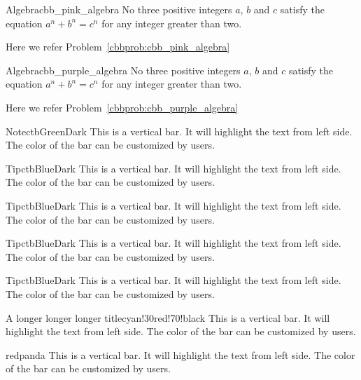 \documentclass[11pt, letterpaper]{../src/exercise}
\begin{document}
    \begin{cbbpinkproblem}{Algebra}{cbb_pink_algebra}
    No three positive integers \(a\), \(b\) and \(c\) satisfy the equation
    \(a^{n} + b^{n} = c^{n}\) for any integer greater than two.
    \end{cbbpinkproblem}
    Here we refer Problem~\ref{cbbprob:cbb_pink_algebra}

    \begin{cbbpurpleproblem}{Algebra}{cbb_purple_algebra}
    No three positive integers \(a\), \(b\) and \(c\) satisfy the equation
    \(a^{n} + b^{n} = c^{n}\) for any integer greater than two.
    \end{cbbpurpleproblem}
    Here we refer Problem~\ref{cbbprob:cbb_purple_algebra}

    \begin{cbbar}{Note}{ctbGreenDark}
        This is a vertical bar.
        It will highlight the text from left side.
        The color of the bar can be customized by users.
    \end{cbbar}

    \begin{cbbar}{Tip}{ctbBlueDark}
        This is a vertical bar.
        It will highlight the text from left side.
        The color of the bar can be customized by users.
    \end{cbbar}

    \begin{cbbar}{Tip}{ctbBlueDark}
        This is a vertical bar.
        It will highlight the text from left side.
        The color of the bar can be customized by users.
    \end{cbbar}

    \begin{cbbar}{Tip}{ctbBlueDark}
        This is a vertical bar.
        It will highlight the text from left side.
        The color of the bar can be customized by users.
    \end{cbbar}

    \begin{cbbar}{Tip}{ctbBlueDark}
        This is a vertical bar.
        It will highlight the text from left side.
        The color of the bar can be customized by users.
    \end{cbbar}

    \begin{cbcurvedtitle}{A longer longer longer title}{cyan!30}{red!70!black}
        This is a vertical bar.
        It will highlight the text from left side.
        The color of the bar can be customized by users.
    \end{cbcurvedtitle}

    \begin{cbpictitle}{red}{panda}
        This is a vertical bar.
        It will highlight the text from left side.
        The color of the bar can be customized by users.
    \end{cbpictitle}
\end{document}
